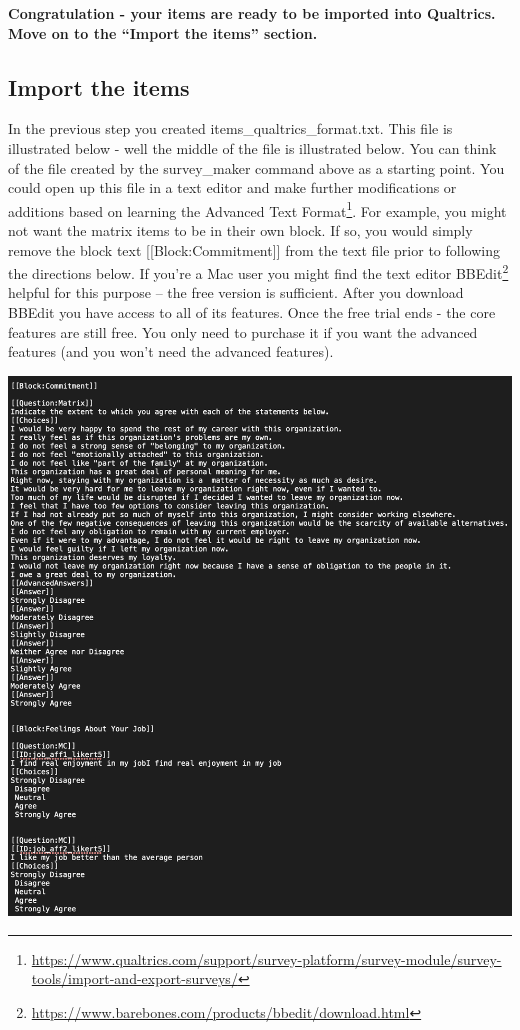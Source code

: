 \documentclass[
]{krantz}
\renewcommand{\href}[2]{#2\footnote{\url{#1}}}
\begin{document}
\textbf{Congratulation - your items are ready to be imported into Qualtrics. Move on to the ``Import the items'' section.}

\hypertarget{import-the-items}{%
\subsection{Import the items}\label{import-the-items}}

In the previous step you created items\_qualtrics\_format.txt. This file is illustrated below - well the middle of the file is illustrated below. You can think of the file created by the survey\_maker command above as a starting point. You could open up this file in a text editor and make further modifications or additions based on learning the \href{https://www.qualtrics.com/support/survey-platform/survey-module/survey-tools/import-and-export-surveys/}{Advanced Text Format}. For example, you might not want the matrix items to be in their own block. If so, you would simply remove the block text {[}{[}Block:Commitment{]}{]} from the text file prior to following the directions below. If you're a Mac user you might find the text editor \href{https://www.barebones.com/products/bbedit/download.html}{BBEdit} helpful for this purpose -- the free version is sufficient. After you download BBEdit you have access to all of its features. Once the free trial ends - the core features are still free. You only need to purchase it if you want the advanced features (and you won't need the advanced features).

\includegraphics[width=1\linewidth]{ch_qualtrics/images/screenshot_advanced_text}
\end{document}
